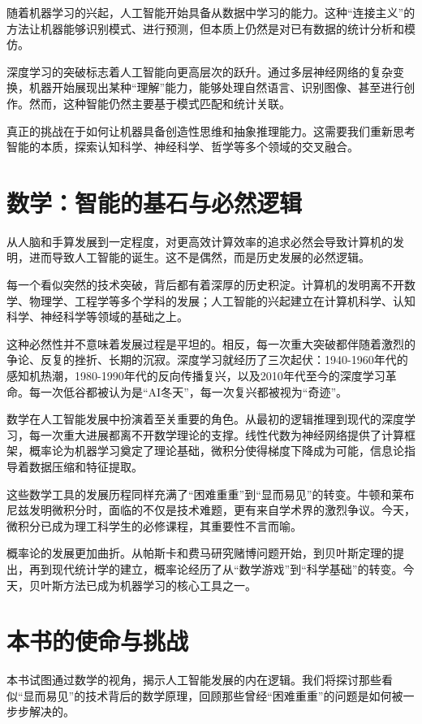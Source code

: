随着机器学习的兴起，人工智能开始具备从数据中学习的能力。这种“连接主义”的方法让机器能够识别模式、进行预测，但本质上仍然是对已有数据的统计分析和模仿。

深度学习的突破标志着人工智能向更高层次的跃升。通过多层神经网络的复杂变换，机器开始展现出某种“理解”能力，能够处理自然语言、识别图像、甚至进行创作。然而，这种智能仍然主要基于模式匹配和统计关联。

真正的挑战在于如何让机器具备创造性思维和抽象推理能力。这需要我们重新思考智能的本质，探索认知科学、神经科学、哲学等多个领域的交叉融合。

\section{数学：智能的基石与必然逻辑}

从人脑和手算发展到一定程度，对更高效计算效率的追求必然会导致计算机的发明，进而导致人工智能的诞生。这不是偶然，而是历史发展的必然逻辑。

每一个看似突然的技术突破，背后都有着深厚的历史积淀。计算机的发明离不开数学、物理学、工程学等多个学科的发展；人工智能的兴起建立在计算机科学、认知科学、神经科学等领域的基础之上。

这种必然性并不意味着发展过程是平坦的。相反，每一次重大突破都伴随着激烈的争论、反复的挫折、长期的沉寂。深度学习就经历了三次起伏：1940-1960年代的感知机热潮，1980-1990年代的反向传播复兴，以及2010年代至今的深度学习革命。每一次低谷都被认为是“AI冬天”，每一次复兴都被视为“奇迹”。

数学在人工智能发展中扮演着至关重要的角色。从最初的逻辑推理到现代的深度学习，每一次重大进展都离不开数学理论的支撑。线性代数为神经网络提供了计算框架，概率论为机器学习奠定了理论基础，微积分使得梯度下降成为可能，信息论指导着数据压缩和特征提取。

这些数学工具的发展历程同样充满了“困难重重”到“显而易见”的转变。牛顿和莱布尼兹发明微积分时，面临的不仅是技术难题，更有来自学术界的激烈争议。今天，微积分已成为理工科学生的必修课程，其重要性不言而喻。

概率论的发展更加曲折。从帕斯卡和费马研究赌博问题开始，到贝叶斯定理的提出，再到现代统计学的建立，概率论经历了从“数学游戏”到“科学基础”的转变。今天，贝叶斯方法已成为机器学习的核心工具之一。

\section{本书的使命与挑战}

本书试图通过数学的视角，揭示人工智能发展的内在逻辑。我们将探讨那些看似“显而易见”的技术背后的数学原理，回顾那些曾经“困难重重”的问题是如何被一步步解决的。

